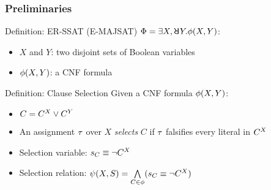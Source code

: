\begin{frame}
  \frametitle{Preliminaries}
  \begin{block}{Definition: ER-SSAT (E-MAJSAT)}
    $\Qf=\exists X,\random{} Y.\pf(X,Y)$:
    \begin{itemize}
      \item $X$ and $Y$: two disjoint sets of Boolean variables
      \item $\phi(X,Y)$: a CNF formula
    \end{itemize}
  \end{block}
  \pause
  \begin{block}{Definition: Clause Selection}
    Given a CNF formula $\phi(X,Y)$:
    \begin{itemize}
      \item $C=C^X\lor C^Y$
      \item An assignment $\tau$ over $X$ \textit{selects} $C$ if $\tau$ falsifies every literal in $C^X$
      \item Selection variable: $s_{C}\equiv\lnot C^X$
      \item Selection relation: $\psi(X,S)=\bigwedge\limits_{C\in\phi}(s_{C}\equiv\lnot C^X)$
    \end{itemize}
  \end{block}
\end{frame}
